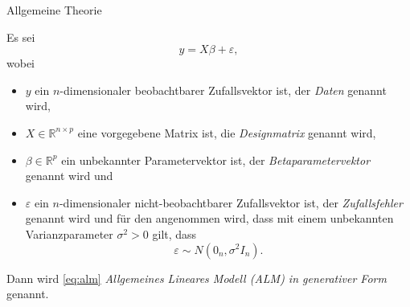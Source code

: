 \documentclass[
  8pt,
  ignorenonframetext,
]{beamer}
\begin{document}
\begin{frame}{Allgemeine Theorie}
\protect\hypertarget{allgemeine-theorie}{}
\small
\begin{definition}
\justifying
Es sei
\begin{equation}\label{eq:alm}
y = X\beta + \varepsilon,
\end{equation}
wobei
\begin{itemize}
\item $y$ ein $n$-dimensionaler beobachtbarer Zufallsvektor ist, der \textit{Daten} genannt wird,
\item $X \in \mathbb{R}^{n \times p}$ eine vorgegebene Matrix ist, die \textit{Designmatrix} genannt wird,
\item $\beta \in \mathbb{R}^p$ ein unbekannter Parametervektor ist, der \textit{Betaparametervektor} genannt wird und
\item $\varepsilon$ ein $n$-dimensionaler nicht-beobachtbarer Zufallsvektor ist, der \textit{Zufallsfehler} genannt wird und für den angenommen wird, dass
mit einem unbekannten Varianzparameter $\sigma^2>0$ gilt, dass
\begin{equation}
\varepsilon \sim N\left(0_n, \sigma^2I_n\right).
\end{equation}
\end{itemize}
Dann wird \eqref{eq:alm} \textit{Allgemeines Lineares Modell (ALM) in generativer Form} genannt.
\end{definition}
\end{frame}
\end{document}
